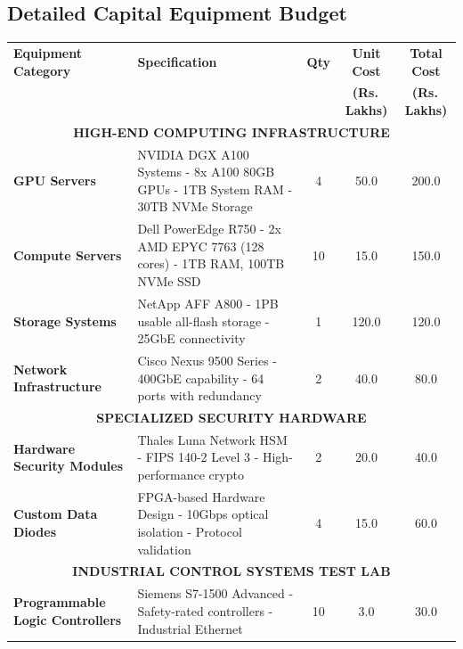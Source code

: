 \documentclass[12pt,a4paper]{article}
\newcommand{\rupees}{Rs.\,}
\begin{document}
\subsection{Detailed Capital Equipment Budget}

\begin{longtable}{|p{4cm}|p{6cm}|c|c|c|}
\hline
\rowcolor{lightblue}
\textbf{Equipment Category} & \textbf{Specification} & \textbf{Qty} & \textbf{Unit Cost} & \textbf{Total Cost} \\
& & & \textbf{(\rupees Lakhs)} & \textbf{(\rupees Lakhs)} \\
\hline
\endhead

\multicolumn{5}{|c|}{\cellcolor{gray}\textbf{HIGH-END COMPUTING INFRASTRUCTURE}} \\
\hline

\textbf{GPU Servers} & 
NVIDIA DGX A100 Systems
- 8x A100 80GB GPUs
- 1TB System RAM  
- 30TB NVMe Storage & 4 & 50.0 & 200.0 \\
\hline

\textbf{Compute Servers} & 
Dell PowerEdge R750
- 2x AMD EPYC 7763 (128 cores)
- 1TB RAM, 100TB NVMe SSD & 10 & 15.0 & 150.0 \\
\hline

\textbf{Storage Systems} & 
NetApp AFF A800
- 1PB usable all-flash storage
- 25GbE connectivity & 1 & 120.0 & 120.0 \\
\hline

\textbf{Network Infrastructure} & 
Cisco Nexus 9500 Series
- 400GbE capability
- 64 ports with redundancy & 2 & 40.0 & 80.0 \\
\hline

\multicolumn{5}{|c|}{\cellcolor{gray}\textbf{SPECIALIZED SECURITY HARDWARE}} \\
\hline

\textbf{Hardware Security Modules} & 
Thales Luna Network HSM
- FIPS 140-2 Level 3
- High-performance crypto & 2 & 20.0 & 40.0 \\
\hline

\textbf{Custom Data Diodes} & 
FPGA-based Hardware Design
- 10Gbps optical isolation
- Protocol validation & 4 & 15.0 & 60.0 \\
\hline

\multicolumn{5}{|c|}{\cellcolor{gray}\textbf{INDUSTRIAL CONTROL SYSTEMS TEST LAB}} \\
\hline

\textbf{Programmable Logic Controllers} & 
Siemens S7-1500 Advanced
- Safety-rated controllers
- Industrial Ethernet & 10 & 3.0 & 30.0 \\
\hline


\end{longtable}
\end{document}
